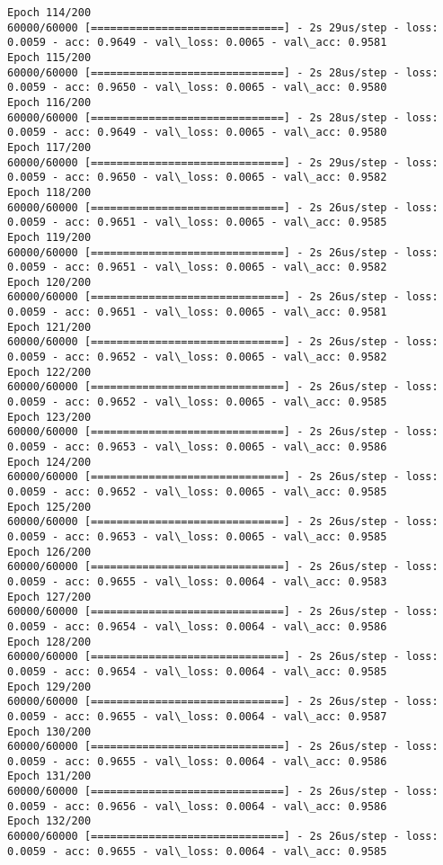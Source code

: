 \documentclass[11pt]{article}
\begin{document}
\begin{Verbatim}[commandchars=\\\{\}]
Epoch 114/200
60000/60000 [==============================] - 2s 29us/step - loss: 0.0059 - acc: 0.9649 - val\_loss: 0.0065 - val\_acc: 0.9581
Epoch 115/200
60000/60000 [==============================] - 2s 28us/step - loss: 0.0059 - acc: 0.9650 - val\_loss: 0.0065 - val\_acc: 0.9580
Epoch 116/200
60000/60000 [==============================] - 2s 28us/step - loss: 0.0059 - acc: 0.9649 - val\_loss: 0.0065 - val\_acc: 0.9580
Epoch 117/200
60000/60000 [==============================] - 2s 29us/step - loss: 0.0059 - acc: 0.9650 - val\_loss: 0.0065 - val\_acc: 0.9582
Epoch 118/200
60000/60000 [==============================] - 2s 26us/step - loss: 0.0059 - acc: 0.9651 - val\_loss: 0.0065 - val\_acc: 0.9585
Epoch 119/200
60000/60000 [==============================] - 2s 26us/step - loss: 0.0059 - acc: 0.9651 - val\_loss: 0.0065 - val\_acc: 0.9582
Epoch 120/200
60000/60000 [==============================] - 2s 26us/step - loss: 0.0059 - acc: 0.9651 - val\_loss: 0.0065 - val\_acc: 0.9581
Epoch 121/200
60000/60000 [==============================] - 2s 26us/step - loss: 0.0059 - acc: 0.9652 - val\_loss: 0.0065 - val\_acc: 0.9582
Epoch 122/200
60000/60000 [==============================] - 2s 26us/step - loss: 0.0059 - acc: 0.9652 - val\_loss: 0.0065 - val\_acc: 0.9585
Epoch 123/200
60000/60000 [==============================] - 2s 26us/step - loss: 0.0059 - acc: 0.9653 - val\_loss: 0.0065 - val\_acc: 0.9586
Epoch 124/200
60000/60000 [==============================] - 2s 26us/step - loss: 0.0059 - acc: 0.9652 - val\_loss: 0.0065 - val\_acc: 0.9585
Epoch 125/200
60000/60000 [==============================] - 2s 26us/step - loss: 0.0059 - acc: 0.9653 - val\_loss: 0.0065 - val\_acc: 0.9585
Epoch 126/200
60000/60000 [==============================] - 2s 26us/step - loss: 0.0059 - acc: 0.9655 - val\_loss: 0.0064 - val\_acc: 0.9583
Epoch 127/200
60000/60000 [==============================] - 2s 26us/step - loss: 0.0059 - acc: 0.9654 - val\_loss: 0.0064 - val\_acc: 0.9586
Epoch 128/200
60000/60000 [==============================] - 2s 26us/step - loss: 0.0059 - acc: 0.9654 - val\_loss: 0.0064 - val\_acc: 0.9585
Epoch 129/200
60000/60000 [==============================] - 2s 26us/step - loss: 0.0059 - acc: 0.9655 - val\_loss: 0.0064 - val\_acc: 0.9587
Epoch 130/200
60000/60000 [==============================] - 2s 26us/step - loss: 0.0059 - acc: 0.9655 - val\_loss: 0.0064 - val\_acc: 0.9586
Epoch 131/200
60000/60000 [==============================] - 2s 26us/step - loss: 0.0059 - acc: 0.9656 - val\_loss: 0.0064 - val\_acc: 0.9586
Epoch 132/200
60000/60000 [==============================] - 2s 26us/step - loss: 0.0059 - acc: 0.9655 - val\_loss: 0.0064 - val\_acc: 0.9585

\end{Verbatim}
\end{document}
